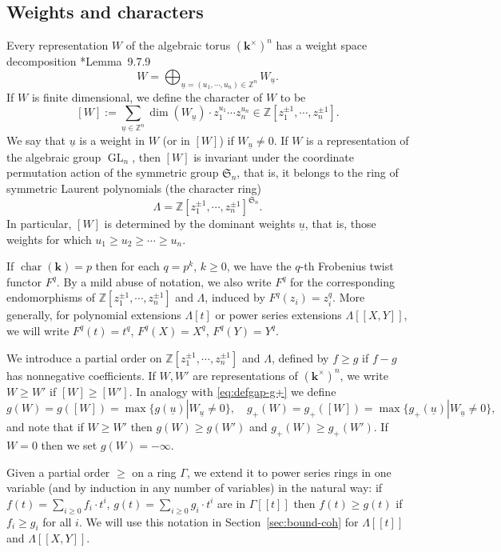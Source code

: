\documentclass[11pt,reqno]{amsart}
\newcommand{\defi}[1]{{\upshape\sffamily #1}}
\def\kk{{\mathbf k}}
\newcommand{\GL}{\operatorname{GL}}
\newcommand{\bb}[1]{\mathbb{#1}}
\newcommand{\mf}[1]{\mathfrak{#1}}
\newcommand{\op}[1]{\operatorname{#1}}
\newcommand{\ul}[1]{\underline{#1}}
\theoremstyle{definition}
\theoremstyle{remark}
\numberwithin{equation}{section}
\begin{document}
\subsection{Weights and characters}
\label{subsec:weight-chars}

Every representation $W$ of the algebraic torus $(\kk^\times)^n$ has a weight space decomposition \cite{BCRV}*{Lemma~9.7.9}
\[ W = \bigoplus_{\ul{u}=(u_1,\cdots,u_n)\in\bb{Z}^n} W_{\ul{u}}.\]
If $W$ is finite dimensional, we define the \defi{character of $W$} to be
\[[W] := \sum_{\ul{u}\in\bb{Z}^n} \dim(W_{\ul{u}})\cdot z_1^{u_1}\cdots z_n^{u_n} \in \bb{Z}[z_1^{\pm 1},\cdots,z_n^{\pm 1}].\]
We say that $\ul{u}$ is a weight in $W$ (or in $[W]$) if $W_{\ul{u}}\neq 0$. If $W$ is a representation of the algebraic group $\GL_n$, then $[W]$ is invariant under the coordinate permutation action of the symmetric group $\mf{S}_n$, that is, it belongs to the ring of symmetric Laurent polynomials (the \defi{character ring})
\begin{equation}\label{eq:def-Lambda} 
\Lambda = \bb{Z}[z_1^{\pm 1},\cdots,z_n^{\pm 1}]^{\mf{S}_n}.
\end{equation}
In particular, $[W]$ is determined by the \defi{dominant weights} $\ul{u}$, that is, those weights for which $u_1\geq u_2\geq\cdots\geq u_n$. 

If $\op{char}(\kk)=p$ then for each $q=p^k$, $k\geq 0$, we have the $q$-th Frobenius twist functor $F^q$. By a mild abuse of notation, we also write  $F^q$ for the corresponding endomorphisms of $\bb{Z}[z_1^{\pm 1},\cdots,z_n^{\pm 1}]$ and $\Lambda$, induced by $F^q(z_i)=z_i^q$. More generally, for polynomial extensions $\Lambda[t]$ or power series extensions $\Lambda[[X,Y]]$, we will write $F^q(t)=t^q$, $F^q(X)=X^q$, $F^q(Y)=Y^q$.

We introduce a partial order on $\bb{Z}[z_1^{\pm 1},\cdots,z_n^{\pm 1}]$ and $\Lambda$, defined by $f\geq g$ if $f-g$ has nonnegative coefficients. If $W,W'$ are representations of $(\kk^\times)^n$, we write $W\geq W'$ if $[W]\geq [W']$. In analogy with \eqref{eq:defgap-g+} we define
\begin{equation}\label{eq:gap-character}
g(W)=g([W])=\max\{g(\ul{u}) | W_{\ul{u}}\neq 0\},\quad g_+(W)=g_+([W])=\max\{g_+(\ul{u}) | W_{\ul{u}}\neq 0\},
\end{equation}
and note that if $W\geq W'$ then $g(W)\geq g(W')$ and $g_+(W)\geq g_+(W')$. If $W=0$ then we set $g(W)=-\infty$. 

Given a partial order $\geq$ on a ring $\Gamma$, we extend it to power series rings in one variable (and by induction in any number of variables) in the natural way: if $f(t)=\sum_{i\geq 0}f_i\cdot t^i$, $g(t)=\sum_{i\geq 0}g_i\cdot t^i$ are in $\Gamma[[t]]$ then $f(t)\geq g(t)$ if $f_i\geq g_i$ for all $i$. We will use this notation in Section~\ref{sec:bound-coh}
for $\Lambda[[t]]$ and $\Lambda[[X,Y]]$.
\end{document}
